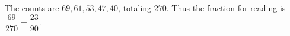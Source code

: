 The counts are $69,61,53,47,40$, totaling $270$. Thus the fraction for reading is $\dfrac{69}{270}=\boxed{\dfrac{23}{90}}$.
